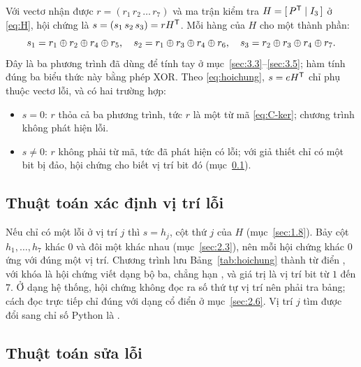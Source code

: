 Với vectơ nhận được $r = (r_1\,r_2\,\dots\,r_7)$ và ma trận kiểm tra
$H = [\,P^{\mathsf{T}} \mid I_3\,]$ ở \eqref{eq:H}, hội chứng là
$s = (s_1\,s_2\,s_3) = rH^{\mathsf{T}}$. Mỗi hàng của $H$ cho một thành phần:
\begin{equation}\label{eq:s-thanhphan}
  s_1 = r_1 \oplus r_2 \oplus r_4 \oplus r_5, \quad
  s_2 = r_1 \oplus r_3 \oplus r_4 \oplus r_6, \quad
  s_3 = r_2 \oplus r_3 \oplus r_4 \oplus r_7 .
\end{equation}
Đây là ba phương trình đã dùng để tính tay ở mục~\ref{sec:3.3}--\ref{sec:3.5};
hàm  tính đúng ba biểu thức này bằng phép XOR. Theo
\eqref{eq:hoichung}, $s = eH^{\mathsf{T}}$ chỉ phụ thuộc vectơ lỗi, và có hai trường hợp:
\begin{itemize}
  \item $s = 0$: $r$ thỏa cả ba phương trình, tức $r$ là một từ mã
        \eqref{eq:C-ker}; chương trình không phát hiện lỗi.
  \item $s \neq 0$: $r$ không phải từ mã, tức đã phát hiện có lỗi; với giả
        thiết chỉ có một bit bị đảo, hội chứng cho biết vị trí bit đó
        (mục~\ref{ss:4.3.2}).
\end{itemize}

\subsection{Thuật toán xác định vị trí lỗi}
\label{ss:4.3.2}

Nếu chỉ có một lỗi ở vị trí $j$ thì $s = h_j$, cột thứ $j$ của $H$
(mục~\ref{sec:1.8}). Bảy cột $h_1, \dots, h_7$ khác $0$ và đôi một khác nhau
(mục~\ref{sec:2.3}), nên mỗi hội chứng khác $0$ ứng với đúng một vị trí. Chương
trình lưu Bảng~\ref{tab:hoichung} thành từ điển , với khóa
là hội chứng viết dạng bộ ba, chẳng hạn \mbox{}, và giá trị là vị trí
bit từ $1$ đến $7$. Ở dạng hệ thống, hội chứng không đọc ra số thứ tự vị trí nên
phải tra bảng; cách đọc trực tiếp chỉ đúng với dạng cổ điển ở
mục~\ref{sec:2.6}. Vị trí $j$ tìm được đổi sang chỉ số Python là
.

\subsection{Thuật toán sửa lỗi}
\label{ss:4.3.3}

